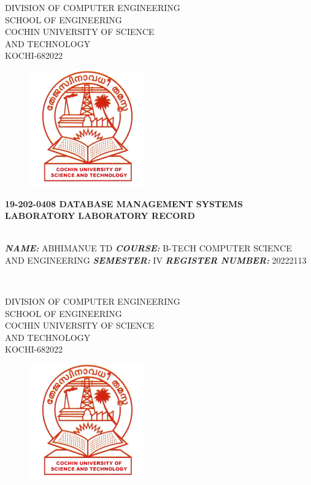 \documentclass{article}
\begin{document}
\setlength{\headsep}{0.1in}

\centering
 {\Large DIVISION OF COMPUTER ENGINEERING\\ SCHOOL OF ENGINEERING\\ COCHIN UNIVERSITY OF SCIENCE\\ AND TECHNOLOGY\\ KOCHI-682022\\ }
 \begin{figure}[h]
     \centering
     \vspace{1cm}
     \includegraphics[height=5cm]{logo.png}
 \end{figure}


{\large \vspace{1cm} \textbf{19-202-0408 DATABASE MANAGEMENT SYSTEMS LABORATORY} \singlespacing \textbf{LABORATORY RECORD \vspace{1cm}}
}

\begin{mytextbox}
\doublespacing
\textbf{\\ \textit{NAME:}} ABHIMANUE TD\singlespacing
\textbf{\textit{COURSE:}} B-TECH COMPUTER SCIENCE AND ENGINEERING\singlespacing
\textbf{\textit{SEMESTER:}} IV\singlespacing
\textbf{\textit{REGISTER NUMBER:}} 20222113
\end{mytextbox}
\pagestyle{empty}



\newpage
\begin{verbatim}
    
\end{verbatim}


\newpage
 {\Large DIVISION OF COMPUTER ENGINEERING\\ SCHOOL OF ENGINEERING\\ COCHIN UNIVERSITY OF SCIENCE\\ AND TECHNOLOGY\\ KOCHI-682022\\ }
 \begin{figure}[h]
     \centering
     \vspace{1cm}
     \includegraphics[height=5cm]{logo.png}
 \end{figure}
\end{document}
